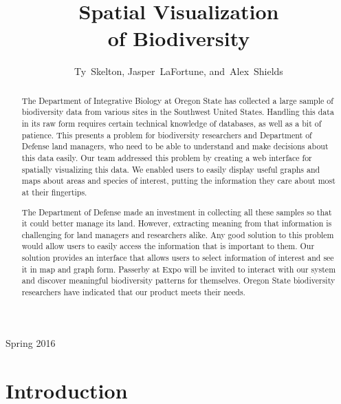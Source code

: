 \documentclass[10pt,draftclsnofoot,onecolumn]{IEEEtran}
\begin{document}
\singlespacing
\title{Spatial Visualization\\ of Biodiversity}

\author{Ty~Skelton,
        Jasper~LaFortune,
        and~Alex~Shields}%

%
{Spring 2016}

\maketitle

\begin{abstract} %
The Department of Integrative Biology at Oregon State has collected a large sample of biodiversity data from various sites in the Southwest United States.
Handling this data in its raw form requires certain technical knowledge of databases, as well as a bit of patience.
This presents a problem for biodiversity researchers and Department of Defense land managers, who need to be able to understand and make decisions about this data easily.
Our team addressed this problem by creating a web interface for spatially visualizing this data.
We enabled users to easily display useful graphs and maps about areas and species of interest, putting the information they care about most at their fingertips.

The Department of Defense made an investment in collecting all these samples so that it could better manage its land.
However, extracting meaning from that information is challenging for land managers and researchers alike.
Any good solution to this problem would allow users to easily access the information that is important to them.
Our solution provides an interface that allows users to select information of interest and see it in map and graph form.
Passerby at Expo will be invited to interact with our system and discover meaningful biodiversity patterns for themselves.
Oregon State biodiversity researchers have indicated that our product meets their needs.

\end{abstract}
\IEEEpeerreviewmaketitle

\newpage
\tableofcontents
\newpage
{}
\section{Introduction} %

\end{document}
